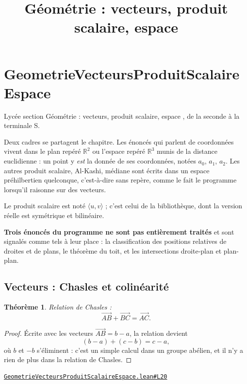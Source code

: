 \documentclass[11pt,a4paper]{article}
\title{Géométrie : vecteurs, produit scalaire, espace}
\date{}
\theoremstyle{definition}
\theoremstyle{plain}
\newtheorem{theoreme}{Théorème}
\newcommand{\source}[2]{\par\smallskip\noindent\hfill{\footnotesize\href{#1}{\texttt{#2}}}\par\smallskip}
\begin{document}
\maketitle
\sloppy

\section{GeometrieVecteursProduitScalaireEspace}

\noindent
Lycée \textemdash{} section \og{} Géométrie : vecteurs, produit scalaire, espace \fg{}, de
la seconde à la terminale S.

\medskip\noindent
Deux cadres se partagent le chapitre. Les énoncés qui parlent de coordonnées vivent dans
le plan repéré $\mathbb{R}^{2}$ ou l'espace repéré $\mathbb{R}^{3}$ munis de la distance
euclidienne : un point y \emph{est} la donnée de ses coordonnées, notées $a_0$, $a_1$,
$a_2$. Les autres \textemdash{} produit scalaire, Al-Kashi, médiane \textemdash{} sont
écrits dans un espace préhilbertien quelconque, c'est-à-dire sans repère, comme le fait le
programme lorsqu'il raisonne sur des vecteurs.

\medskip\noindent
Le produit scalaire est noté $\langle u, v\rangle$ ; c'est celui de la bibliothèque, dont
la version réelle est symétrique et bilinéaire.

\medskip\noindent
\textbf{Trois énoncés du programme ne sont pas entièrement traités} et sont signalés comme
tels à leur place : la classification des positions relatives de droites et de plans, le
théorème du toit, et les intersections droite-plan et plan-plan.

\subsection{Vecteurs : Chasles et colinéarité}

\begin{theoreme}
Relation de Chasles :
\[ \overrightarrow{AB} + \overrightarrow{BC} = \overrightarrow{AC} . \]
\end{theoreme}

\begin{proof}
Écrite avec les vecteurs $\overrightarrow{AB} = b - a$, la relation devient
\[ (b - a) + (c - b) = c - a , \]
où $b$ et $-b$ s'éliminent : c'est un simple calcul dans un groupe abélien, et il n'y a
rien de plus dans la relation de Chasles.
\end{proof}
\source{https://github.com/Commutator-IO/learn-lean/blob/main/courses/02-lycee/08-geometrie-vecteurs-produit-scalaire-espace/GeometrieVecteursProduitScalaireEspace.lean\#L20}{GeometrieVecteursProduitScalaireEspace.lean\#L20}
\end{document}
